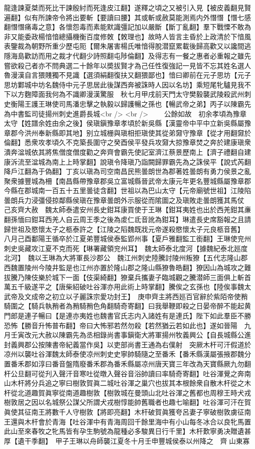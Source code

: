 龍逢諫夏桀而死比干諫殷紂而死逢皮江翻】遂釋之頃之又被引入見【被皮義翻見賢遍翻】似有所諫帝令將出要斬【要讀曰腰】其或斬或赦莫能測焉内外憯憯【憯七感翻憯憯痛毒之意】各懷怨毒而素能默識彊記加以嚴斷【斷丁亂翻】羣下戰慄不敢為非又能委政楊愔愔總攝機衡百度修敇【敇理也】故時人皆言主昏於上政清於下愔風表鑒裁為朝野所重少歷屯阨【爾朱屠害楊氏唯愔得脫潜竄累載後歸高歡又以讒間逃隱海島歡訪而用之裁才代翻少詩照翻屯陟倫翻】及得志有一餐之惠者必重報之雖先嘗欲殺己者亦不問典選二十餘年以奬拔賢才為己任性復強記一見皆不忘其姓名選人魯漫漢自言猥賤獨不見識【選須絹翻復扶又翻猥鄙也】愔曰卿前在元子思坊【元子思坊鄴城中坊名魏侍中元子思居此後謀西奔被誅時人因以名坊】乘短尾牝驢見我不下以方麴障面我何為不識卿漫漢驚服　秋七月甲戌前天門太守樊毅襲武陵殺武州刺史衡陽王護王琳使司馬潘忠擊之執毅以歸護暢之孫也【暢武帝之弟】丙子以陳霸先為中書監司徒揚州刺史進爵長城<br />
<br />
　　公餘如故　初余孝頃為豫章太守【姓譜余姓由余之後】侯瑱鎭豫章孝頃於新吳縣【漢靈帝中平中立新吳縣屬豫章郡今洪州奉新縣即其地】别立城栅與瑱相拒瑱使其從弟奫守豫章【從才用翻奫於倫翻】悉衆攻孝頃久不克築長圍守之癸酉侯平發兵攻奫大掠豫章焚之奔於建康瑱衆潰奔湓城依其將焦僧度僧度勸之奔齊會霸先使記室濟江蔡景歷南上【濟子禮翻自建康泝流至湓城為南上上時掌翻】說瑱令降瑱乃詣闕歸罪霸先為之誅侯平【說式芮翻降戶江翻為于偽翻】丁亥以瑱為司空南昌民熊曇朗世為郡著姓曇朗有勇力侯景之亂聚衆據豐城為柵【南昌縣帶豫章郡吳立富城縣晉武帝太康元年更名豐城縣屬豫章郡今縣在郡城南一百五十五里曇徒含翻】世祖以為巴山太守【元帝廟號世祖】江陵陷曇朗兵力浸彊侵掠鄰縣侯瑱在豫章曇朗外示服從而隂圖之及瑱敗走曇朗獲其馬仗　己亥齊大赦　魏太師泰遣安州長史鉗耳康買使于王琳【鉗耳夷姓也出於西羌鉗其亷翻孫愐曰鉗耳西羌人自云周王季之後為䖍仁氐音訛為鉗耳】琳遣長史席豁報之且請歸世祖及愍懷太子之柩泰許之【江陵之䧟魏既戕元帝遂殺愍懷太子元良柩音舊】　八月己酉鄱陽王循卒於江夏弟豐城侯泰監郢州事【夏戶雅翻監工銜翻】王琳使兖州刺史吳藏攻江夏不克而死【琳署藏領兖州耳】　魏太師泰北度河【據魏紀泰北廵度北河】　魏以王琳為大將軍長沙郡公　魏江州刺史陸騰討陵州叛獠【五代志隆山郡西魏置陵州今陵井監是也江州亦置於隆山郡之隆山縣獠魯皓翻】獠因山為城攻之難拔騰乃陳伎樂於城下一面【伎渠綺翻】獠棄兵攜妻子臨城觀之騰潜師三面俱上斬首萬五千級遂平之【唐柴紹破吐谷渾亦用此術上時掌翻】騰俟之玄孫也【陸俟事魏太武帝及文成帝之初立以子麗誅宗愛功封王】　庚申齊主將西廵百官辭於紫陌帝使矟騎圍之【騎兵執矟者為矟騎矟色角翻騎奇寄翻】曰我舉鞭即殺之日晏帝醉不能起黄門郎是連子暢曰【是連亦夷姓也魏書官氏志内入諸姓有是連氏】陛下如此羣臣不勝恐怖【勝音升怖普布翻】帝曰大怖邪若然勿殺【若然猶云若如此也】遂如晉陽　九月壬寅改元大赦以陳霸先為丞相錄尚書事鎭衛大將軍揚州牧義興公【自長城縣公進封義興郡公按陳書帝紀義當作吳】以吏部尚書王通為右僕射　突厥木杆可汗假道於凉州以襲吐谷渾魏太師泰使凉州刺史史寧帥騎隨之至番禾【番禾縣漢屬張掖郡魏分置番禾郡如淳曰番音盤隋廢番禾郡為番禾縣屬凉州唐天寶三年改為天寶縣厥九勿翻杆公旦翻可從刋入聲汗音寒吐從暾入聲谷音浴帥讀曰率騎奇寄翻】吐谷渾覺之奔南山木杆將分兵追之寧曰樹敦賀眞二城吐谷渾之巢穴也拔其本根餘衆自散木杆從之木杆從北道趣賀眞寧從南道趣樹敦【樹敦城在曼頭山北吐谷渾之舊都也周穆王時犬戎樹敦居之因以名城祭公謀父所謂犬戎樹惇能帥舊職者也趣七喻翻】吐谷渾可汗在賀眞使其征南王將數千人守樹敦【將即亮翻】木杆破賀眞獲夸呂妻子寧破樹敦虜征南王還與木杆會於青海【吐谷渾中有青海周回千餘里海中有小山每冬冰合以良牝馬置此山至來春牧之牝馬皆有孕生駒號為龍種必多駿異日行千里】木杆歎寧勇决贈遺甚厚【遺干季翻】　甲子王琳以舟師襲江夏冬十月壬申豐城侯泰以州降之　齊山東寡